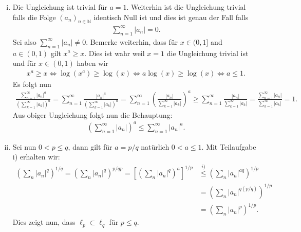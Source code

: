 \documentclass[a4paper, 20]{exam}
\begin{document}
\begin{solution}
\begin{enumerate}[i)]
\item Die Ungleichung ist trivial für $a=1$. Weiterhin ist die Ungleichung trivial falls die Folge $(a_n)_{n \in \mathbb{N}}$ identisch Null ist und dies ist genau der Fall falls 
\begin{align*}
\sum_{n=1}^\infty |a_n|=0.
\end{align*}
Sei also $\sum_{n=1}^\infty |a_n| \neq 0$. Bemerke weiterhin, dass für $x \in (0,1]$ and $a \in (0,1)$ gilt $x^a \geq x$. Dies ist wahr weil $x =1$ die Ungleichung trivial ist und für $x \in (0,1)$ haben wir
\begin{align*}
x^a \geq x \iff  \log (x^a) \geq \log (x) \iff a \log(x) \geq \log (x) \iff a \leq 1.
\end{align*}
Es folgt nun
\begin{align*}
\frac{\sum_{n=1}^\infty |a_n|^a}{\left( \sum_{k=1}^\infty |a_k|\right)^a} = \sum_{n=1}^\infty \frac{|a_n|^a}{\left( \sum_{k=1}^\infty |a_k|\right)^a} = \sum_{n=1}^\infty \left( \frac{|a_n|}{\sum_{k=1}^\infty |a_k|}\right)^a \geq \sum_{n=1}^\infty \frac{|a_n|}{\sum_{k=1}^\infty |a_k|} = \frac{\sum_{n=1}^\infty |a_n|}{\sum_{k=1}^\infty |a_k|}=1.
\end{align*}
Aus obiger Ungleichung folgt nun die Behauptung:
\begin{align*}
\left( \sum_{n=1}^\infty |a_n| \right)^a \leq \sum_{n=1}^\infty |a_n|^a.
\end{align*}
\item Sei nun $0 < p \leq q$, dann gilt für $a = p/q$ natürlich $0<a \leq 1$. Mit Teilaufgabe i) erhalten wir:
\begin{align*}
\left( \sum_n |a_n|^q \right)^{1/q} = \left( \sum_n |a_n|^q \right)^{p/qp}  = \left[\left( \sum_{n} |a_n|^q \right)^a\right]^{1/p} &\overset{i)}\leq \left( \sum_n |a_n|^{aq} \right)^{1/p} \\
&= \left( \sum_{n} |a_n|^{q (p/q)} \right)^{1/p} \\
&= \left( \sum_n |a_n|^p \right)^{1/p}.
\end{align*}
Dies zeigt nun, dass $\ell_p \subset \ell_q$ für $p \leq q$. 
\end{enumerate}
\end{solution}
\end{document}
